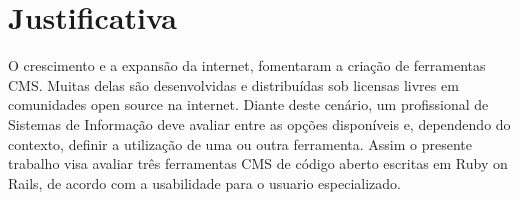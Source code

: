 \section{Justificativa}
 
O crescimento e a expansão da internet, fomentaram a criação de ferramentas CMS. Muitas delas são desenvolvidas e distribuídas sob licensas livres em comunidades open source na internet. Diante deste cenário, um profissional de Sistemas de Informação deve avaliar entre as opções disponíveis e, dependendo do contexto, definir a utilização de uma ou outra ferramenta. Assim o presente trabalho visa avaliar três ferramentas CMS de código aberto escritas em Ruby on Rails,  de acordo com a usabilidade para o usuario especializado.






    
